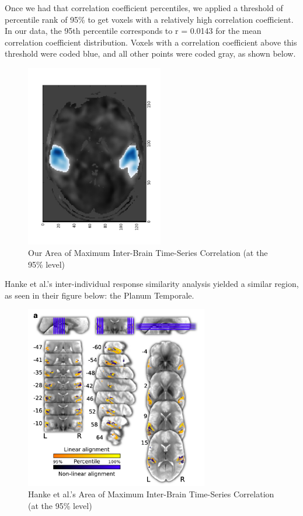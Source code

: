 \documentclass[11pt]{article}
\begin{document}
Once we had that correlation coefficient percentiles, we applied a threshold of 
percentile rank of 95\% to get voxels with a relatively high correlation 
coefficient.  In our data, the 95th percentile corresponds to r = 0.0143 for 
the mean correlation coefficient distribution.  Voxels with a correlation
coefficient above this threshold were coded blue, and all other points 
were coded gray, as shown below.  
\begin{figure}[H]                                                               
\caption{Our Area of Maximum Inter-Brain Time-Series Correlation (at the 95\% level)}
\centering                                                                      
\includegraphics[height=8cm]{correlated_brain.png}                            
\end{figure}  

Hanke et al.'s inter-individual response similarity analysis yielded a similar region, as seen in their figure below: the Planum Temporale\cite{hank2014audiomovie}.
\begin{figure}[H]                                                               
\caption{Hanke et al.'s Area of Maximum Inter-Brain Time-Series Correlation (at the 95\% level)}
\centering                                                                      
\includegraphics[height=8cm]{hanke_temporal_cortex.png}                            
\end{figure}  
\end{document}
